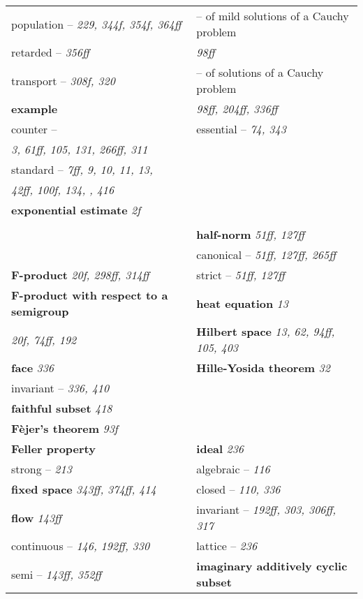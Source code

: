 \begin{longtable}{p{}p{}}
\quad population -- \textit{229, 344f, 354f, 364ff} & \quad -- of mild solutions of a Cauchy problem \\
\quad retarded -- \textit{356ff} & \quad\quad \textit{98ff} \\
\quad transport -- \textit{308f, 320} & \quad -- of solutions of a Cauchy problem \\
\textbf{example} & \quad\quad \textit{98ff, 204ff, 336ff} \\
\quad counter -- & \quad essential -- \textit{74, 343} \\
\quad\quad \textit{3, 61ff, 105, 131, 266ff, 311} & \\
\quad standard -- \textit{7ff, 9, 10, 11, 13,} & \\
\quad\quad \textit{42ff, 100f, 134, , 416} & \\
\textbf{exponential estimate} \textit{2f} & \\
& \\
& \textbf{half-norm} \textit{51ff, 127ff} \\
& \quad canonical -- \textit{51ff, 127ff, 265ff} \\
\textbf{F-product} \textit{20f, 298ff, 314ff} & \quad strict -- \textit{51ff, 127ff} \\
\textbf{F-product with respect to a semigroup} & \textbf{heat equation} \textit{13} \\
\quad \textit{20f, 74ff, 192} & \textbf{Hilbert space} \textit{13, 62, 94ff, 105, 403} \\
\textbf{face} \textit{336} & \textbf{Hille-Yosida theorem} \textit{32} \\
\quad invariant -- \textit{336, 410} & \\
\textbf{faithful subset} \textit{418} & \\
\textbf{Fèjer's theorem} \textit{93f} & \\
\textbf{Feller property} & \textbf{ideal} \textit{236} \\
\quad strong -- \textit{213} & \quad algebraic -- \textit{116} \\
\textbf{fixed space} \textit{343ff, 374ff, 414} & \quad closed -- \textit{110, 336} \\
\textbf{flow} \textit{143ff} & \quad invariant -- \textit{192ff, 303, 306ff, 317} \\
\quad continuous -- \textit{146, 192ff, 330} & \quad lattice -- \textit{236} \\
\quad semi -- \textit{143ff, 352ff} & \textbf{imaginary additively cyclic subset} \\

\end{longtable}
